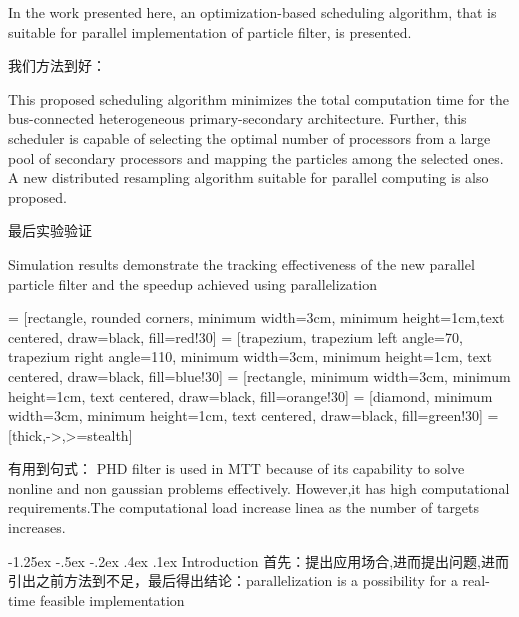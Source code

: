 \documentclass[a4paper, 11pt]{article}
\makeatletter
\newcommand{\xiaosihao}{\fontsize{12pt}{\baselineskip}\selectfont}
\renewcommand\subsection{\@startsection{subsection}{1}{\z@}%
{-1.25ex \@plus -.5ex \@minus -.2ex}%
{.4ex \@plus .1ex}%
{\normalfont\xiaosihao\CJKfamily{hei}}}
\makeatother
\begin{document}
\begin{CJK}{UTF8}{gbsn}
  In the work presented here, an optimization-based scheduling algorithm,
that is suitable for parallel implementation of particle filter, is
presented.

我们方法到好：

 This proposed scheduling algorithm minimizes the
total computation time for the bus-connected heterogeneous
primary-secondary architecture. Further, this scheduler is capable
of selecting the optimal number of processors from a large pool
of secondary processors and mapping the particles among the
selected ones. A new distributed resampling algorithm suitable
for parallel computing is also proposed.


  最后实验验证
  
  Simulation
results demonstrate the tracking effectiveness of the new parallel
particle filter and the speedup achieved using parallelization
  
 = [rectangle, rounded corners, minimum width=3cm, minimum height=1cm,text centered, draw=black, fill=red!30]
 = [trapezium, trapezium left angle=70, trapezium right angle=110, minimum width=3cm, minimum height=1cm, text centered, draw=black, fill=blue!30]
 = [rectangle, minimum width=3cm, minimum height=1cm, text centered, draw=black, fill=orange!30]
 = [diamond, minimum width=3cm, minimum height=1cm, text centered, draw=black, fill=green!30]
 = [thick,->,>=stealth]
 
  
  
  有用到句式： PHD filter is used in MTT because of its capability to solve nonline and non gaussian problems effectively. However,it has high computational requirements.The computational load increase linea as the number of targets increases.
  
  \subsection{Introduction}
  首先：提出应用场合,进而提出问题,进而引出之前方法到不足，最后得出结论：parallelization is a possibility for a real-time feasible implementation
  

\end{CJK}
\end{document}
